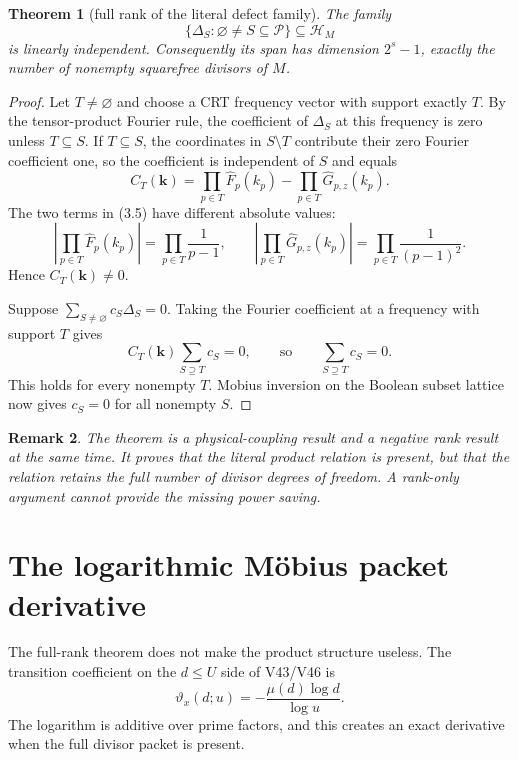 \documentclass[11pt]{article}
\newtheorem{theorem}{Theorem}[section]
\newtheorem{remark}[theorem]{Remark}
\newcommand{\DeltaP}{\Delta}
\newcommand{\muM}{\mu}
\begin{document}
\begin{theorem}[full rank of the literal defect family]
\label{thm:fullrank}
The family
\[
 \{\DeltaP_S:\varnothing\ne S\subseteq\mathcal P\}
 \subseteq \mathcal H_M
 \tag{3.4}
\]
is linearly independent.  Consequently its span has dimension
$2^s-1$, exactly the number of nonempty squarefree divisors of $M$.
\end{theorem}

\begin{proof}
Let $T\ne\varnothing$ and choose a CRT frequency vector with support exactly
$T$.  By the tensor-product Fourier rule, the coefficient of $\DeltaP_S$ at
this frequency is zero unless $T\subseteq S$.  If $T\subseteq S$, the
coordinates in $S\setminus T$ contribute their zero Fourier coefficient one,
so the coefficient is independent of $S$ and equals
\[
 C_T(\boldsymbol k)=
 \prod_{p\in T}\widehat F_p(k_p)
 -\prod_{p\in T}\widehat G_{p,z}(k_p).
 \tag{3.5}
\]
The two terms in (3.5) have different absolute values:
\[
 \left|\prod_{p\in T}\widehat F_p(k_p)\right|
 =\prod_{p\in T}\frac1{p-1},\qquad
 \left|\prod_{p\in T}\widehat G_{p,z}(k_p)\right|
 =\prod_{p\in T}\frac1{(p-1)^2}.
 \tag{3.6}
\]
Hence $C_T(\boldsymbol k)\ne0$.

Suppose $\sum_{S\ne\varnothing}c_S\DeltaP_S=0$.  Taking the Fourier
coefficient at a frequency with support $T$ gives
\[
 C_T(\boldsymbol k)\sum_{S\supseteq T}c_S=0,
 \qquad\text{so}\qquad
 \sum_{S\supseteq T}c_S=0.
 \tag{3.7}
\]
This holds for every nonempty $T$.  Mobius inversion on the Boolean subset
lattice now gives $c_S=0$ for all nonempty $S$.
\end{proof}

\begin{remark}
The theorem is a physical-coupling result and a negative rank result at the
same time.  It proves that the literal product relation is present, but that
the relation retains the full number of divisor degrees of freedom.  A
rank-only argument cannot provide the missing power saving.
\end{remark}

\section{The logarithmic M\"obius packet derivative}

The full-rank theorem does not make the product structure useless.  The
transition coefficient on the $d\le U$ side of V43/V46 is
\[
 \vartheta_x(d;u)=-\frac{\muM(d)\log d}{\log u}.
 \tag{4.1}
\]
The logarithm is additive over prime factors, and this creates an exact
derivative when the full divisor packet is present.
\end{document}

